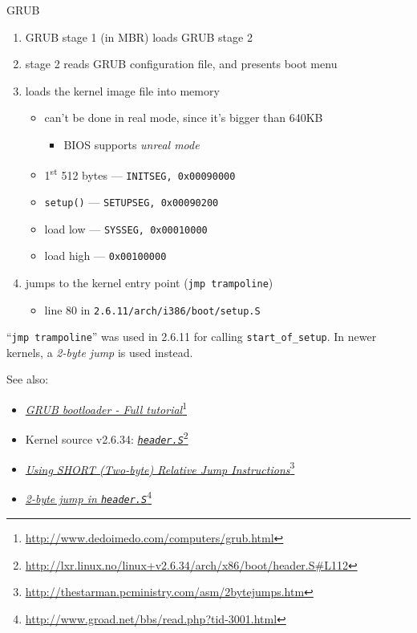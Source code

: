 \begin{frame}[fragile=singleslide]{GRUB}
  \begin{enumerate}
  \item GRUB stage 1 (in MBR) loads GRUB stage 2
  \item stage 2 reads GRUB configuration file, and presents boot menu
  \item loads the kernel image file into memory%
    \begin{itemize}
    \item can't be done in real mode, since it's bigger than 640KB
      \begin{itemize}
      \item BIOS supports \emph{unreal mode}
      \end{itemize}
    \item 1\textsuperscript{st} 512 bytes --- \texttt{INITSEG, 0x00090000}
    \item \texttt{setup()} --- \texttt{SETUPSEG, 0x00090200}
    \item load low --- \texttt{SYSSEG, 0x00010000}
    \item load high --- \texttt{0x00100000}
    \end{itemize}
  \item jumps to the kernel entry point (\texttt{jmp trampoline})
    \begin{itemize}
    \item line 80 in \texttt{2.6.11/arch/i386/boot/setup.S}
    \end{itemize}
  \end{enumerate}
\end{frame}

``\texttt{jmp trampoline}'' was used in 2.6.11 for calling \texttt{start\_of\_setup}. In
newer kernels, a \emph{2-byte jump} is used instead.

See also:
\begin{itemize}
\item \href{http://www.dedoimedo.com/computers/grub.html}{\emph{GRUB bootloader - Full
      tutorial}}\footnote{\url{http://www.dedoimedo.com/computers/grub.html}}
\item Kernel source v2.6.34:
  \href{http://lxr.linux.no/linux+v2.6.34/arch/x86/boot/header.S\#L112}{\emph{\texttt{header.S}}}\footnote{\url{http://lxr.linux.no/linux+v2.6.34/arch/x86/boot/header.S\#L112}}
\item \href{http://thestarman.pcministry.com/asm/2bytejumps.htm}{\emph{Using SHORT
      (Two-byte) Relative Jump
      Instructions}}\footnote{\url{http://thestarman.pcministry.com/asm/2bytejumps.htm}}
\item \href{http://www.groad.net/bbs/read.php?tid-3001.html}{\emph{2-byte jump in
      \texttt{header.S}}}\footnote{\url{http://www.groad.net/bbs/read.php?tid-3001.html}}
\end{itemize}

